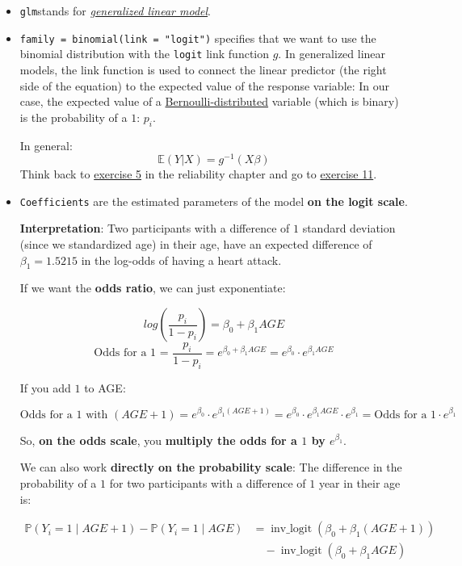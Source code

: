 \documentclass[
]{book}
\begin{document}
\begin{itemize}
\item
  \texttt{glm}stands for \href{https://en.wikipedia.org/wiki/Generalized_linear_model}{\emph{generalized linear model}}.
\item
  \texttt{family\ =\ binomial(link\ =\ "logit")} specifies that we want to use the
  binomial distribution with the \texttt{logit} link function \(g\).
  In generalized linear models, the link function is used to connect the linear predictor
  (the right side of the equation) to the expected value of the response variable:
  In our case, the expected value of a \href{https://en.wikipedia.org/wiki/Bernoulli_distribution\#:~:text=The\%20Bernoulli\%20distribution\%20is\%20a,not\%20be\%200\%20and\%201.}{Bernoulli-distributed}
  variable (which is binary) is the probability of a \(1\): \(p_i\).

  In general:
  \[\mathbb{E}(Y|X) = g^{-1}(X \beta)\]
  Think back to \href{https://jdegenfellner.github.io/Script_QM3_ZHAW/further-regression-methods.html\#exercise5_LMM}{exercise 5}
  in the reliability chapter and go to \href{exercise11_LMM}{exercise 11}.
\item
  \texttt{Coefficients} are the estimated parameters of the model \textbf{on the logit scale}.

  \textbf{Interpretation}: Two participants with a difference of \(1\) standard
  deviation (since we standardized age) in their age,
  have an expected difference of \(\beta_1 = 1.5215\) in the log-odds of having
  a heart attack.

  If we want the \textbf{odds ratio}, we can just exponentiate:

  \[log(\frac{p_i}{1-p_i}) = \beta_0 + \beta_1 AGE\]
  \[\text{Odds for a 1 = } \frac{p_i}{1-p_i} = e^{\beta_0 + \beta_1 AGE} = e^{\beta_0} \cdot e^{\beta_1 AGE}\]

  If you add \(1\) to AGE:

  \[\text{Odds for a 1 with } (AGE + 1) = e^{\beta_0} \cdot e^{\beta_1 (AGE + 1)} = e^{\beta_0} \cdot e^{\beta_1 AGE} \cdot e^{\beta_1} = \text{Odds for a 1} \cdot e^{\beta_1}\]

  So, \textbf{on the odds scale}, you \textbf{multiply the odds for a \(1\) by \(e^{\beta_1}\)}.

  We can also work \textbf{directly on the probability scale}:
  The difference in the probability of a \(1\) for two participants with a
  difference of \(1\) year in their age is:

  \[
  \begin{aligned}
  \mathbb{P}(Y_i = 1 \mid AGE + 1) - \mathbb{P}(Y_i = 1 \mid AGE) 
  &= \operatorname{inv\_logit}(\beta_0 + \beta_1 (AGE + 1)) \\
  &\quad - \operatorname{inv\_logit}(\beta_0 + \beta_1 AGE)
  \end{aligned}
  \]


\end{itemize}
\end{document}
